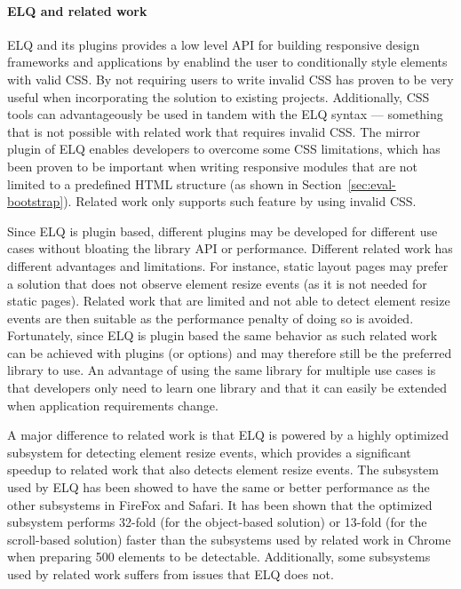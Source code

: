\documentclass[a4paper,11pt]{kth-mag}
\begin{document}
    \paragraph{ELQ and related work}
    \gls{ELQ} and its plugins provides a low level API for building \gls{responsive} design frameworks and applications by enablind the user to conditionally style \glspl{element} with valid CSS.
    By not requiring users to write invalid CSS has proven to be very useful when incorporating the solution to existing projects.
    Additionally, CSS tools can advantageously be used in tandem with the \gls{ELQ} syntax --- something that is not possible with related work that requires invalid CSS.
    The mirror plugin of \gls{ELQ} enables developers to overcome some CSS limitations, which has been proven to be important when writing \gls{responsive} modules that are not limited to a predefined \gls{HTML} structure (as shown in Section~\ref{sec:eval-bootstrap}).
    Related work only supports such feature by using invalid CSS.

    Since \gls{ELQ} is plugin based, different plugins may be developed for different use cases without bloating the library API or performance.
    Different related work has different advantages and limitations.
    For instance, static layout pages may prefer a solution that does not observe element resize events (as it is not needed for static pages).
    Related work that are limited and not able to detect element resize events are then suitable as the performance penalty of doing so is avoided.
    Fortunately, since \gls{ELQ} is plugin based the same behavior as such related work can be achieved with plugins (or options) and may therefore still be the preferred library to use.
    An advantage of using the same library for multiple use cases is that developers only need to learn one library and that it can easily be extended when application requirements change.

    A major difference to related work is that \gls{ELQ} is powered by a highly optimized subsystem for detecting element resize events, which provides a significant speedup to related work that also detects element resize events.
    The subsystem used by \gls{ELQ} has been showed to have the same or better performance as the other subsystems in FireFox and Safari.
    It has been shown that the optimized subsystem performs 32-fold (for the object-based solution) or 13-fold (for the scroll-based solution) faster than the subsystems used by related work in Chrome when preparing 500 \glspl{element} to be detectable.
    Additionally, some subsystems used by related work suffers from issues that \gls{ELQ} does not.
\end{document}
